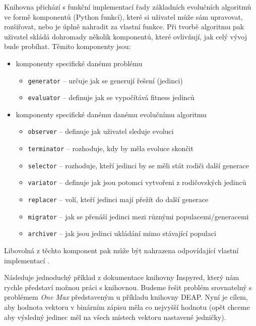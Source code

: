 Knihovna přichází s funkční implementací řady základních 
evolučních algoritmů ve formě komponentů (Python funkcí), které si uživatel
může sám upravovat, rozšiřovat, nebo je úplně nahradit za vlastní funkce. Při
tvorbě algoritmu pak uživatel skládá dohromady několik komponentů, které
ovlivňují, jak celý vývoj bude probíhat.
Těmito komponenty jsou:
\begin{itemize}[a)]
    \item komponenty specifické danému problému
        \begin{itemize}
            \item \texttt{generator} -- určuje jak se generují řešení (jedinci)
            \item \texttt{evaluator} -- definuje jak se vypočítává fitness
                jedinců
        \end{itemize}
    \item komponenty specifické danému danému evolučnímu algoritmu
        \begin{itemize}
            \item \texttt{observer} -- definuje jak uživatel sleduje evoluci
            \item \texttt{terminator} -- rozhoduje, kdy by měla evoluce skončit
            \item \texttt{selector} -- rozhoduje, kteří jedinci by se měli stát
                rodiči další generace
            \item \texttt{variator} -- definuje jak jsou potomci vytvořeni z
                rodičovských jedinců
            \item \texttt{replacer} -- volí, kteří jedinci mají přežít do další
                generace
            \item \texttt{migrator} -- jak se přenáší jedinci mezi různými
                populacemi/generacemi
            \item \texttt{archiver} -- jak jsou jedinci ukládání mimo stávající
                populaci
        \end{itemize}
\end{itemize}

Libovolná z těchto komponent pak může být nahrazena odpovídající vlastní
implementací \citep{tonda2020inspyred}.

Následuje jednoduchý příklad z dokumentace knihovny Inspyred, který nám rychle
představí možnou práci s knihovnou. Budeme řešit problém srovnatelný s
problémem \emph{One Max} představeným u příkladu knihovny DEAP. Nyní je cílem,
aby hodnota vektoru v binárním zápisu měla co nejvyšší hodnotu (opět chceme aby
výsledný jedinec měl na všech místech vektoru nastavené jedničky). 

